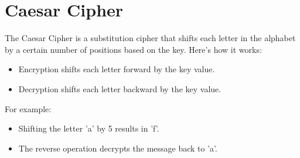 \documentclass{article}
\begin{document}
\section{Caesar Cipher}
The Caesar Cipher is a substitution cipher that shifts each letter in the alphabet by a certain number of positions based on the key. Here's how it works:
\begin{itemize}
    \item Encryption shifts each letter forward by the key value.
    \item Decryption shifts each letter backward by the key value.
\end{itemize}

For example:
\begin{itemize}
    \item Shifting the letter 'a' by 5 results in 'f'.
    \item The reverse operation decrypts the message back to 'a'.
\end{itemize}
\end{document}
